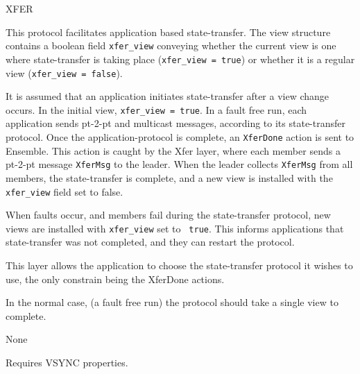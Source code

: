 \begin{Layer}{XFER}

This protocol facilitates application based state-transfer. 
The view structure contains a boolean field {\tt xfer\_view}
conveying whether the current view is one where
state-transfer is taking place ({\tt xfer\_view = true}) or whether it 
is a regular view ({\tt xfer\_view = false}).

\begin{Protocol}
It is assumed that an application initiates state-transfer after a view
change occurs. In the initial view, {\tt xfer\_view = true}. 
In a fault free run, 
each application sends pt-2-pt and multicast messages, according
to its state-transfer protocol. Once the application-protocol is
complete, an {\tt XferDone} action is sent to Ensemble. 
This action is caught by the Xfer layer, where each member sends a pt-2-pt
message {\tt XferMsg} to the leader. When the leader
collects {\tt XferMsg} from all members, the state-transfer is
complete, and a new view is installed with the {\tt xfer\_view} field
set to false. 

When faults occur, and members fail during the state-transfer
protocol, new views are installed with {\tt xfer\_view} set to {\tt
true}. This informs applications that state-transfer was not
completed, and they can restart the protocol. 
\end{Protocol}

\begin{Notes}
\item 
This layer allows the application to choose
the state-transfer protocol it wishes to use, the only constrain being
the XferDone actions. 

\item 
In the normal case, (a fault free run) the protocol should take a 
single view to complete. 
\end{Notes}

\begin{Parameters}
\item None
\end{Parameters}

\begin{Properties}
\item
Requires VSYNC properties.
\end{Properties}

\begin{Sources}
\end{Sources}

\end{Layer}


